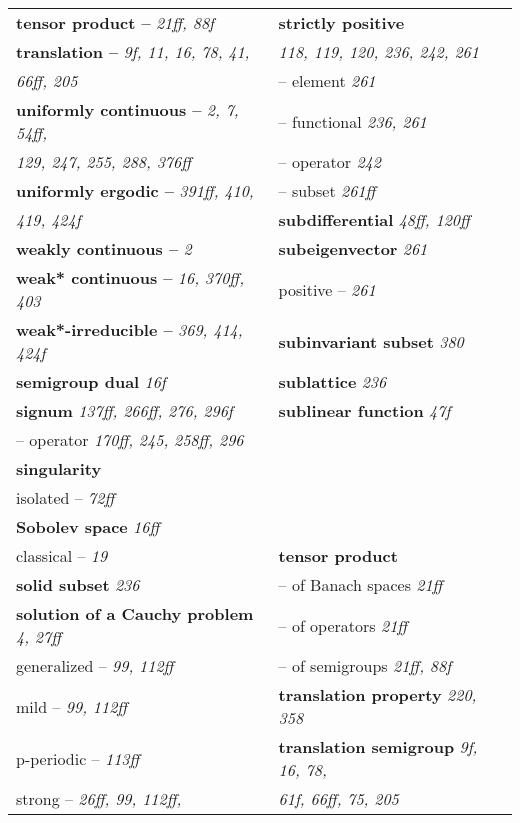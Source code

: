 \documentclass{article}
\begin{document}
\begin{longtable}{p{}p{}}
\textbf{tensor product --} \textit{21ff, 88f} & \textbf{strictly positive} \\
\textbf{translation --} \textit{9f, 11, 16, 78, 41,} & \quad \textit{118, 119, 120, 236, 242, 261} \\
\quad \textit{66ff, 205} & \quad -- element \textit{261} \\
\textbf{uniformly continuous --} \textit{2, 7, 54ff,} & \quad -- functional \textit{236, 261} \\
\quad \textit{129, 247, 255, 288, 376ff} & \quad -- operator \textit{242} \\
\textbf{uniformly ergodic --} \textit{391ff, 410,} & \quad -- subset \textit{261ff} \\
\quad \textit{419, 424f} & \textbf{subdifferential} \textit{48ff, 120ff} \\
\textbf{weakly continuous --} \textit{2} & \textbf{subeigenvector} \textit{261} \\
\textbf{weak* continuous --} \textit{16, 370ff, 403} & \quad positive -- \textit{261} \\
\textbf{weak*-irreducible --} \textit{369, 414, 424f} & \textbf{subinvariant subset} \textit{380} \\
\textbf{semigroup dual} \textit{16f} & \textbf{sublattice} \textit{236} \\
\textbf{signum} \textit{137ff, 266ff, 276, 296f} & \textbf{sublinear function} \textit{47f} \\
\quad -- operator \textit{170ff, 245, 258ff, 296} & \\
\textbf{singularity} & \\
\quad isolated -- \textit{72ff} & \\
\textbf{Sobolev space} \textit{16ff} & \\
\quad classical -- \textit{19} & \textbf{tensor product} \\
\textbf{solid subset} \textit{236} & \quad -- of Banach spaces \textit{21ff} \\
\textbf{solution of a Cauchy problem} \textit{4, 27ff} & \quad -- of operators \textit{21ff} \\
\quad generalized -- \textit{99, 112ff} & \quad -- of semigroups \textit{21ff, 88f} \\
\quad mild -- \textit{99, 112ff} & \textbf{translation property} \textit{220, 358} \\
\quad p-periodic -- \textit{113ff} & \textbf{translation semigroup} \textit{9f, 16, 78,} \\
\quad strong -- \textit{26ff, 99, 112ff,} & \quad \textit{61f, 66ff, 75, 205} \\

\end{longtable}
\end{document}
